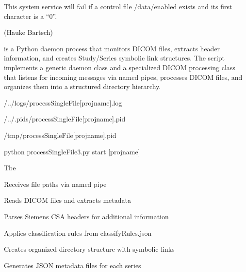 \documentclass[letterpaper,10pt,english]{sphinxmanual}
\begin{document}
\sphinxAtStartPar
This system service will fail if a control file /data/enabled exists and  its first character is a “0”.

\sphinxAtStartPar
(Hauke Bartsch)

\sphinxstepscope

\sphinxAtStartPar
{} is a Python daemon process that monitors DICOM files, extracts header information, and creates Study/Series symbolic link structures. The script implements a generic daemon class and a specialized DICOM processing class that listens for incoming messages via named pipes, processes DICOM files, and organizes them into a structured directory hierarchy.

\sphinxAtStartPar
{}

\begin{DUlineblock}{0em}
\item[] \sphinxhyphen{} 
\item[] \sphinxhyphen{} 
\item[] \sphinxhyphen{}  /../logs/processSingleFile{[}projname{]}.log
\item[] \sphinxhyphen{} 
\item[]
\begin{DUlineblock}{\DUlineblockindent}
\item[] \sphinxhyphen{}        /../.pids/processSingleFile{[}projname{]}.pid
\item[] \sphinxhyphen{}       /tmp/processSingleFile{[}projname{]}.pid
\end{DUlineblock}
\item[] \sphinxhyphen{}  python processSingleFile3.py start {[}projname{]}
\item[] \sphinxhyphen{}  Tbe
\end{DUlineblock}

\sphinxAtStartPar
{}

\begin{DUlineblock}{0em}
\item[] \sphinxhyphen{} Receives file paths via named pipe
\item[] \sphinxhyphen{} Reads DICOM files and extracts metadata
\item[] \sphinxhyphen{} Parses Siemens CSA headers for additional information
\item[] \sphinxhyphen{} Applies classification rules from classifyRules.json
\item[] \sphinxhyphen{} Creates organized directory structure with symbolic links
\item[] \sphinxhyphen{} Generates JSON metadata files for each series
\end{DUlineblock}
\end{document}
